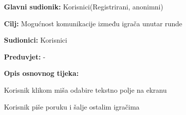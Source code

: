 				    				\noindent {}
				    \begin{packed_item}
				    	
				    	\item \textbf{Glavni sudionik: } Korisnici(Registrirani, anonimni)
				    	\item  \textbf{Cilj:} Mogućnost komunikacije između igrača unutar runde
				    	\item  \textbf{Sudionici:} Korisnici
				    	\item  \textbf{Preduvjet:} -
				    	\item  \textbf{Opis osnovnog tijeka:} 
				    	
				    	\item[] \begin{packed_enum}
				    		
				    		\item Korisnik klikom miša odabire tekstno polje na ekranu
				    		\item Korisnik piše poruku i šalje ostalim igračima
				    	\end{packed_enum}
				    \end{packed_item}
			    
